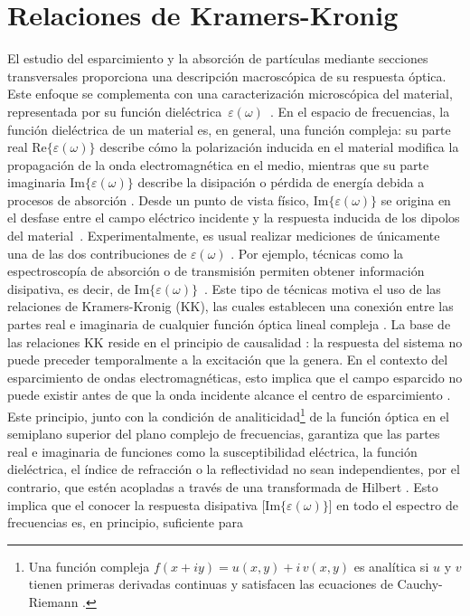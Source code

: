 

\section{Relaciones de Kramers-Kronig}
\label{section:rKK}

El estudio del esparcimiento y la absorción de partículas mediante secciones transversales proporciona una descripción macroscópica de su respuesta óptica. Este enfoque se complementa con una caracterización microscópica del material, representada por su función dieléctrica~$\varepsilon(\omega)$~\cite{lucariniKramersKronigRelationsOptical2005}. En el espacio de frecuencias, la función dieléctrica de un material es, en general, una función compleja: su parte real $\text{Re}\{\varepsilon(\omega)\}$ describe cómo la polarización inducida en el material modifica la propagación de la onda electromagnética en el medio, mientras que su parte imaginaria $\text{Im}\{\varepsilon(\omega)\}$ describe la disipación o pérdida de energía debida a procesos de absorción \cite{maierPlasmonicsFundamentalsApplications2007}. Desde un punto de vista físico, $\text{Im}\{\varepsilon(\omega)\}$ se origina en el desfase entre el campo eléctrico incidente y la respuesta inducida de los dipolos del material~\cite{royHilbertTransformBrief2024}. Experimentalmente, es usual realizar mediciones de únicamente una de las dos contribuciones de $\varepsilon(\omega)$ \cite{terdaleIntensitymodulatedOpticalFiber2022,brindzaThinSampleRefractive2014,liuRealPartRefractive2015}. Por ejemplo, técnicas como la espectroscopía de absorción o de transmisión permiten obtener información disipativa, es decir, de $\text{Im}\{\varepsilon(\omega)\}$~\cite{lucariniKramersKronigRelationsOptical2005}. Este tipo de técnicas motiva el uso de las relaciones de Kramers-Kronig (KK), las cuales establecen una conexión  entre las partes real e imaginaria de cualquier función óptica lineal compleja \cite{lucariniKramersKronigRelationsOptical2005}. La base de las relaciones KK reside en el principio de causalidad \cite{lucariniKramersKronigRelationsOptical2005}: la respuesta del sistema no puede preceder temporalmente a la excitación que la genera. En el contexto del esparcimiento de ondas electromagnéticas, esto implica que el campo esparcido no puede existir antes de que la onda incidente alcance el centro de esparcimiento \cite{lucariniKramersKronigRelationsOptical2005}. Este principio, junto con la condición de analiticidad\footnote{Una función compleja $f(x+iy)=u(x,y)+i\,v(x,y)$ es analítica si $u$ y $v$ tienen primeras derivadas continuas y satisfacen las ecuaciones de Cauchy-Riemann \cite{arfkenMathematicalMethodsPhysicists2011}.} de la función óptica en el semiplano superior del plano complejo de frecuencias, garantiza que las partes real e imaginaria de funciones como la susceptibilidad eléctrica, la función dieléctrica, el índice de refracción o la reflectividad no sean independientes, por el contrario, que estén acopladas a través de una transformada de Hilbert \cite{lucariniKramersKronigRelationsOptical2005}. Esto implica que el conocer la respuesta disipativa [$\text{Im}\{\varepsilon(\omega)\}$] en todo el espectro de frecuencias es, en principio, suficiente para 